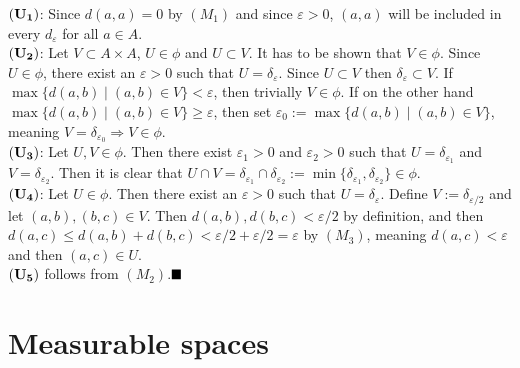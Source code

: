 ${\bf (U_1)}$: Since $d(a,a)=0$ by $(M_1)$ and since $\varepsilon>0$, $(a,a)$ will be included in every $d_\varepsilon$ for all $a\in A$.\\

${\bf (U_2)}$: Let $V\subset A\times A$, $U\in\phi$ and $U\subset V$. It has to be shown that $V\in\phi$. Since $U\in\phi$, there exist an $\varepsilon>0$ such that $U=\delta_\varepsilon$. Since $U\subset V$ then $\delta_\varepsilon\subset V$. If $\max\{d(a,b)\mid (a,b)\in V\}<\varepsilon$, then trivially $V\in\phi$. If on the other hand $\max\{d(a,b)\mid (a,b)\in V\}\geq\varepsilon$, then set $\varepsilon_0:=\max\{d(a,b)\mid (a,b)\in V\}$, meaning $V=\delta_{\varepsilon_0}\Rightarrow V\in\phi$.\\

${\bf (U_3)}$: Let $U,V\in\phi$. Then there exist $\varepsilon_1>0$ and $\varepsilon_2>0$ such that $U=\delta_{\varepsilon_1}$ and $V=\delta_{\varepsilon_2}$. Then it is clear that $U\cap V=\delta_{\varepsilon_1}\cap\delta_{\varepsilon_2}:=\min\{\delta_{\varepsilon_1},\delta_{\varepsilon_2}\}\in\phi$.\\

${\bf (U_4)}$: Let $U\in\phi$. Then there exist an $\varepsilon>0$ such that $U=\delta_\varepsilon$. Define $V:=\delta_{\varepsilon/2}$ and let $(a,b),(b,c)\in V$. Then $d(a,b),d(b,c)<\varepsilon/2$ by definition, and then $d(a,c)\leq d(a,b)+d(b,c)<\varepsilon/2+\varepsilon/2=\varepsilon$ by $(M_3)$, meaning $d(a,c)<\varepsilon$ and then $(a,c)\in U$.\\

${\bf (U_5)}$ follows from $(M_2)$.$\qed$\\

\pagebreak
\section{Measurable spaces}

